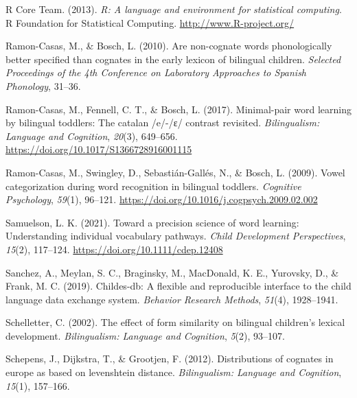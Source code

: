 \documentclass[
]{article}
\newlength{\cslhangindent}
\newlength{\cslentryspacingunit} %
\newenvironment{CSLReferences}[2] %
 {%
  \setlength{\parindent}{0pt}
  \ifodd #1
  \let\oldpar\par
  \def\par{\hangindent=\cslhangindent\oldpar}
  \fi
  \setlength{\parskip}{#2\cslentryspacingunit}
 }%
 {}
\begin{document}
\begin{CSLReferences}{1}{0}
\leavevmode{}%
R Core Team. (2013). \emph{R: A language and environment for statistical
computing}. R Foundation for Statistical Computing.
\url{http://www.R-project.org/}

\leavevmode{}%
Ramon-Casas, M., \& Bosch, L. (2010). Are non-cognate words
phonologically better specified than cognates in the early lexicon of
bilingual children. \emph{Selected Proceedings of the 4th Conference on
Laboratory Approaches to Spanish Phonology}, 31--36.

\leavevmode{}%
Ramon-Casas, M., Fennell, C. T., \& Bosch, L. (2017). Minimal-pair word
learning by bilingual toddlers: The catalan /e/-/ɛ/ contrast revisited.
\emph{Bilingualism: Language and Cognition}, \emph{20}(3), 649--656.
\url{https://doi.org/10.1017/S1366728916001115}

\leavevmode{}%
Ramon-Casas, M., Swingley, D., Sebastián-Gallés, N., \& Bosch, L.
(2009). Vowel categorization during word recognition in bilingual
toddlers. \emph{Cognitive Psychology}, \emph{59}(1), 96--121.
\url{https://doi.org/10.1016/j.cogpsych.2009.02.002}

\leavevmode{}%
Samuelson, L. K. (2021). Toward a precision science of word learning:
Understanding individual vocabulary pathways. \emph{Child Development
Perspectives}, \emph{15}(2), 117--124.
\url{https://doi.org/10.1111/cdep.12408}

\leavevmode{}%
Sanchez, A., Meylan, S. C., Braginsky, M., MacDonald, K. E., Yurovsky,
D., \& Frank, M. C. (2019). Childes-db: A flexible and reproducible
interface to the child language data exchange system. \emph{Behavior
Research Methods}, \emph{51}(4), 1928--1941.

\leavevmode{}%
Schelletter, C. (2002). The effect of form similarity on bilingual
children's lexical development. \emph{Bilingualism: Language and
Cognition}, \emph{5}(2), 93--107.

\leavevmode{}%
Schepens, J., Dijkstra, T., \& Grootjen, F. (2012). Distributions of
cognates in europe as based on levenshtein distance. \emph{Bilingualism:
Language and Cognition}, \emph{15}(1), 157--166.


\end{CSLReferences}
\end{document}
